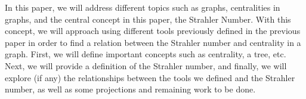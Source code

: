 In this paper, we will address different topics such as graphs, centralities in graphs, and the central concept in this paper, the Strahler Number. With this concept, we will approach using different tools previously defined in the previous paper in order to find a relation between the Strahler number and centrality in a graph. First, we will define important concepts such as centrality, a tree, etc. Next, we will provide a definition of the Strahler number, and finally, we will explore (if any) the relationships between the tools we defined and the Strahler number, as well as some projections and remaining work to be done.